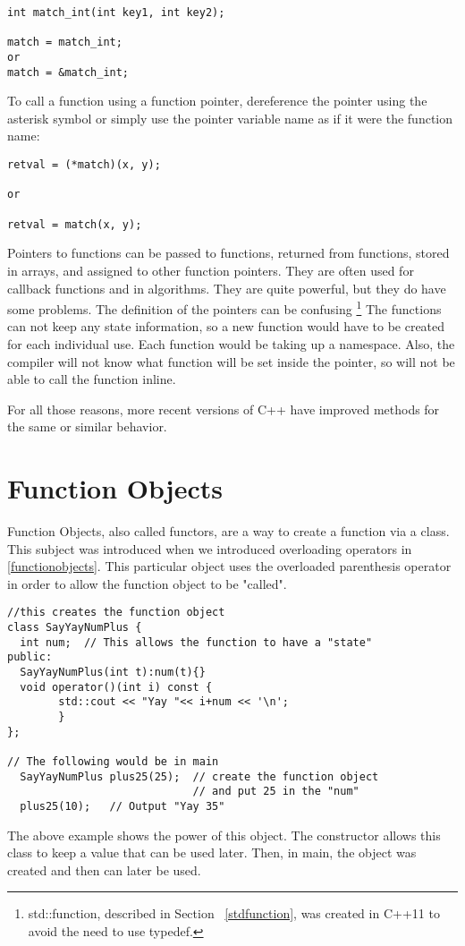 \begin{verbatim}
int match_int(int key1, int key2);

match = match_int;    
or
match = &match_int;
\end{verbatim}


To call a function using a function pointer, dereference the pointer using the asterisk symbol or simply use the pointer variable name as if it were the function name:

\begin{verbatim}
retval = (*match)(x, y);

or

retval = match(x, y);    
\end{verbatim}

 
Pointers to functions can be passed to functions, returned from functions, stored in arrays, and assigned to other function pointers. They are often used for callback functions and in algorithms. They are quite powerful, but they do have some problems. The definition of the pointers can be confusing \footnote{std::function, described in Section ~\ref{stdfunction}, was created in C++11 to avoid the need to use typedef.} The functions can not keep any state information, so a new function would have to be created for each individual use. Each function would be taking up a namespace. Also, the compiler will not know what function will be set inside the pointer, so will not be able to call the function inline. 

For all those reasons, more recent versions of C++ have improved methods for the same or similar behavior. 

\section{Function Objects}
Function Objects, also called functors, are a way to create a function via a class. This subject was introduced when we introduced overloading operators in \ref{functionobjects}. This particular object uses the overloaded parenthesis operator in order to allow the function object to be "called".

\begin{lstlisting}
//this creates the function object
class SayYayNumPlus {
  int num;  // This allows the function to have a "state"
public:
  SayYayNumPlus(int t):num(t){}
  void operator()(int i) const { 
        std::cout << "Yay "<< i+num << '\n'; 
        }
};

// The following would be in main
  SayYayNumPlus plus25(25);  // create the function object
                             // and put 25 in the "num"
  plus25(10);   // Output "Yay 35"
\end{lstlisting}
The above example shows the power of this object.
The constructor allows this class to keep a value that can
be used later. Then, in main, the object was created
and then can later be used. 

